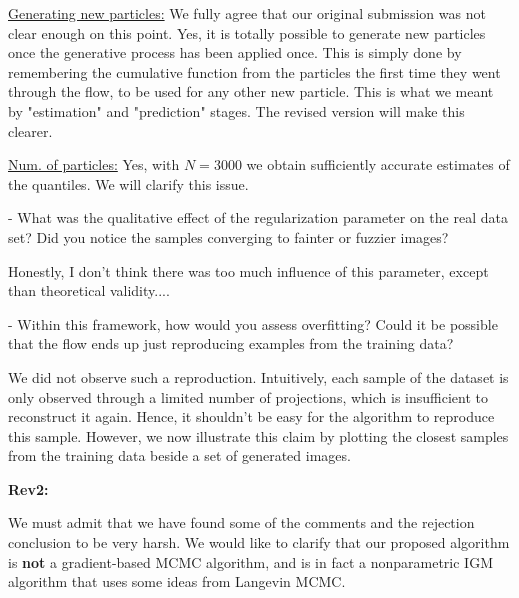 \documentclass{article}
\newcommand{\rev}[1]{{\color{red} #1}}
\newcommand{\umut}[1]{{\color{blue} #1}}
\newcommand{\antoine}[1]{{\color{orange} #1}}
\begin{document}
\underline{Generating new particles:} We fully agree that our original submission was not clear enough on this point. Yes, it is totally possible to generate new particles once the generative process has been applied once. This is simply done by remembering the cumulative function from the particles the first time they went through the flow, to be used for any other new particle. This is what we meant by "estimation" and "prediction" stages. The revised version will make this clearer.




\underline{Num. of particles:} Yes, with $N=3000$ we obtain sufficiently accurate estimates of the quantiles. We will clarify this issue. 


\rev{- What was the qualitative effect of the regularization parameter on the real data set? Did you notice the samples converging to fainter or fuzzier images?}

\antoine{Honestly, I don't think there was too much influence of this parameter, except than theoretical validity....}

\rev{- Within this framework, how would you assess overfitting? Could it be possible that the flow ends up just reproducing examples from the training data?}

\antoine{We did not observe such a reproduction. Intuitively, each sample of the dataset is only observed through a limited number of projections, which is insufficient to reconstruct it again. Hence, it shouldn't be easy for the algorithm to reproduce this sample. However, we now illustrate this claim by plotting the closest samples from the training data beside a set of generated images.}

\textbf{Rev2:}

We must admit that we have found some of the comments and the rejection conclusion to be very harsh. We would like to clarify that our proposed algorithm is \textbf{not} a gradient-based MCMC algorithm, and is in fact a nonparametric IGM algorithm that uses some ideas from Langevin MCMC. 
\end{document}
